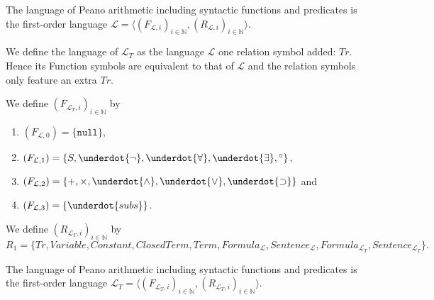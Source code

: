 \begin{definition}\label{def:L}
  \leanok
    The language of Peano arithmetic including syntactic functions and predicates is the first-order language $\mathcal{L} = \langle (F_{\mathcal{L},i})_{i \in \mathbb{N}}, (R_{\mathcal{L},i})_{i \in \mathbb{N}} \rangle$.
\end{definition}

We define the language of $\mathcal{L}_T$ as the language $\mathcal{L}$ one relation symbol added: $Tr$. Hence its Function symbols are equivalent to that of $\mathcal{L}$ and the relation symbols only feature an extra $Tr$.

\begin{definition}\label{def:L_T-Func}
  \leanok
  We define $(F_{\mathcal{L}_T,i})_{i \in \mathbb{N}}$ by
  \begin{enumerate}
  \item $(F_{\mathcal{L},0}) = \{\texttt{null}\}$,
  \item $(F_{\mathcal{L},1}) = \{S, \underdot{\neg} , \underdot{\forall}, \underdot{\exists}, {^\circ}\}$,
  \item $(F_{\mathcal{L},2}) = \{+,\times, \underdot{\wedge}, \underdot{\vee}, \underdot{\supset}\}$ and
  \item $(F_{\mathcal{L},3}) = \{\underdot{subs}\}$.
  \end{enumerate}
\end{definition}

\begin{definition}\label{def:L_T-Rel}
  \leanok
  We define $(R_{\mathcal{L}_T,i})_{i \in \mathbb{N}}$ by \[R_1 = \{Tr,Variable, Constant, ClosedTerm, Term, Formula_{\mathcal{L}}, Sentence_{\mathcal{L}}, Formula_{\mathcal{L}_T}, Sentence_{\mathcal{L}_T}\}.\]
\end{definition}

\begin{definition}\label{def:L_T}
  \leanok
    The language of Peano arithmetic including syntactic functions and predicates is the first-order language $\mathcal{L}_T = \langle (F_{\mathcal{L}_T,i})_{i \in \mathbb{N}}, (R_{\mathcal{L}_T,i})_{i \in \mathbb{N}} \rangle$.
\end{definition}

